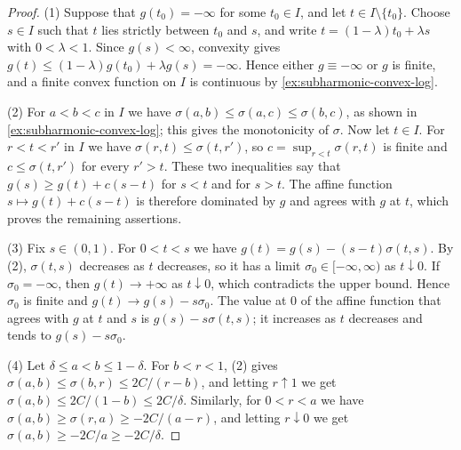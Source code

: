 \begin{proof}
(1) Suppose that $g(t_0)=-\infty$ for some $t_0\in I$, and let $t\in I\setminus\{t_0\}$. Choose $s\in I$ such that $t$ lies strictly between $t_0$ and $s$, and write $t=(1-\lambda)t_0+\lambda s$ with $0<\lambda<1$. Since $g(s)<\infty$, convexity gives $g(t)\leq(1-\lambda)g(t_0)+\lambda g(s)=-\infty$. Hence either $g\equiv-\infty$ or $g$ is finite, and a finite convex function on $I$ is continuous by \cref{ex:subharmonic-convex-log}.

(2) For $a<b<c$ in $I$ we have $\sigma(a,b)\leq\sigma(a,c)\leq\sigma(b,c)$, as shown in \cref{ex:subharmonic-convex-log}; this gives the monotonicity of $\sigma$. Now let $t\in I$. For $r<t<r'$ in $I$ we have $\sigma(r,t)\leq\sigma(t,r')$, so $c=\sup_{r<t}\sigma(r,t)$ is finite and $c\leq\sigma(t,r')$ for every $r'>t$. These two inequalities say that $g(s)\geq g(t)+c(s-t)$ for $s<t$ and for $s>t$. The affine function $s\mapsto g(t)+c(s-t)$ is therefore dominated by $g$ and agrees with $g$ at $t$, which proves the remaining assertions.

(3) Fix $s\in(0,1)$. For $0<t<s$ we have $g(t)=g(s)-(s-t)\sigma(t,s)$. By (2), $\sigma(t,s)$ decreases as $t$ decreases, so it has a limit $\sigma_0\in[-\infty,\infty)$ as $t\downarrow0$. If $\sigma_0=-\infty$, then $g(t)\to+\infty$ as $t\downarrow0$, which contradicts the upper bound. Hence $\sigma_0$ is finite and $g(t)\to g(s)-s\sigma_0$. The value at $0$ of the affine function that agrees with $g$ at $t$ and $s$ is $g(s)-s\sigma(t,s)$; it increases as $t$ decreases and tends to $g(s)-s\sigma_0$.

(4) Let $\delta\leq a<b\leq1-\delta$. For $b<r<1$, (2) gives $\sigma(a,b)\leq\sigma(b,r)\leq2C/(r-b)$, and letting $r\uparrow1$ we get $\sigma(a,b)\leq2C/(1-b)\leq2C/\delta$. Similarly, for $0<r<a$ we have $\sigma(a,b)\geq\sigma(r,a)\geq-2C/(a-r)$, and letting $r\downarrow0$ we get $\sigma(a,b)\geq-2C/a\geq-2C/\delta$.
\end{proof}

